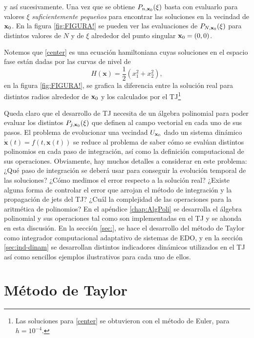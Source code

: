 y así sucesivamente. Una vez que se obtiene $P_{n,\mathbf{x}_0}(\xi)$ basta con evaluarlo para valores $\mathbb{\xi}$ \textit{suficientemente pequeños} para encontrar las soluciones en la vecindad de $\mathbf{x}_0$. En la figura \ref{fig:FIGURA!} se pueden ver las evaluaciones de $P_{N,\mathbf{x}_0}(\xi)$ para distintos valores de $N$ y de $\xi$ alrededor del punto singular $\mathbf{x}_0 = (0,0)$.


Notemos que \ref{center} es una ecuación hamiltoniana cuyas soluciones en el espacio fase están dadas por las curvas de nivel de
\begin{equation*}
H(\mathbf{x}) = \frac{1}{2} \left( x_1^2 + x_2^2 \right),
\end{equation*} 
en la figura \ref{fig:FIGURA!}, se grafica la diferencia entre la solución real para distintos radios alrededor de $\mathbf{x}_0$ y los calculados por el TJ\footnote{Las soluciones para \ref{center} se obtuvieron con el método de Euler, para $h=10^{-4}$.}


Queda claro que el desarrollo de TJ necesita de un álgebra polinomial para poder evaluar los distintos $P_{j,\mathbf{x}_0}(\xi)$ que definen al campo vectorial en cada uno de sus pasos. El problema de evolucionar una vecindad $U_{\mathbf{x}_0}$ dado un sistema dinámico $\dot{\mathbf{x}}(t) = f(t,\mathbf{x}(t))$ se reduce al problema de saber cómo se evalúan distintos polinomios en cada paso de integración, así como la definición computacional de sus operaciones. Obviamente, hay muchos detalles a considerar en este problema: ¿Qué paso de integración se deberá usar para conseguir la evolución temporal de las soluciones? ¿Cómo medimos el error respecto a la solución real? ¿Existe alguna forma de controlar el error que arrojan el método de integración y la propagación de jets del TJ? ¿Cuál la complejidad de las operaciones para la aritmética de polinomios? En el apéndice \ref{chap:AlgPoli} se desarrolla el álgebra polinomial y sus operaciones tal como son implementadas en el TJ y se ahonda en esta discusión. En la sección \ref{sec:}, se hace el desarrollo del método de Taylor como integrador computacional adaptativo de sistemas de EDO, y en la sección \ref{sec:ind-dinam} se desarrollan distintos indicadores dinámicos utilizados en el TJ así como sencillos ejemplos ilustrativos para cada uno de ellos.

\section{Método de Taylor}

